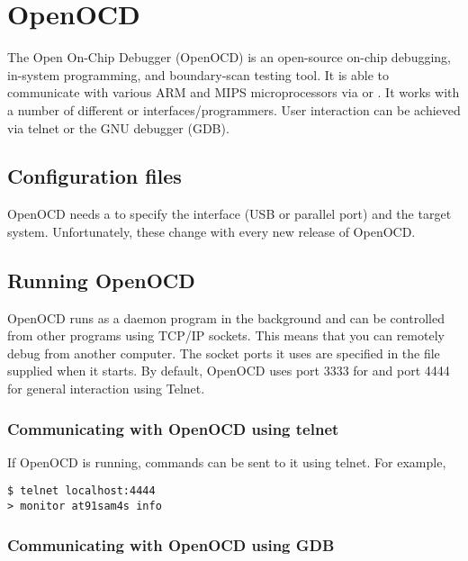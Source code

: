 \chapter{OpenOCD}
\label{OpenOCD}

The Open On-Chip Debugger (OpenOCD) is an open-source on-chip
debugging, in-system programming, and boundary-scan testing tool. It
is able to communicate with various ARM and MIPS microprocessors via
 or . It works with a number of different
 or  interfaces/programmers. User
interaction can be achieved via telnet or the GNU debugger (GDB).

\section{Configuration files}
\label{configuration-files}

OpenOCD needs a  to
specify the interface (USB or parallel port) and the target system.
Unfortunately, these change with every new release of OpenOCD.

\section{Running OpenOCD}
\label{running-openocd}

OpenOCD runs as a daemon program in the background and can be controlled
from other programs using TCP/IP sockets. This means that you can
remotely debug from another computer. The socket ports it uses are
specified in the 
file supplied when it starts. By default, OpenOCD uses port 3333 for
 and port 4444 for general interaction using Telnet.

\subsection{Communicating with OpenOCD using telnet}
\label{communicating-with-openocd-using-telnet}

If OpenOCD is running, commands can be sent to it using telnet. For
example,

\begin{verbatim}
$ telnet localhost:4444
> monitor at91sam4s info
\end{verbatim}

\subsection{Communicating with OpenOCD using GDB}
\label{communicating-with-openocd-using-gdb}

